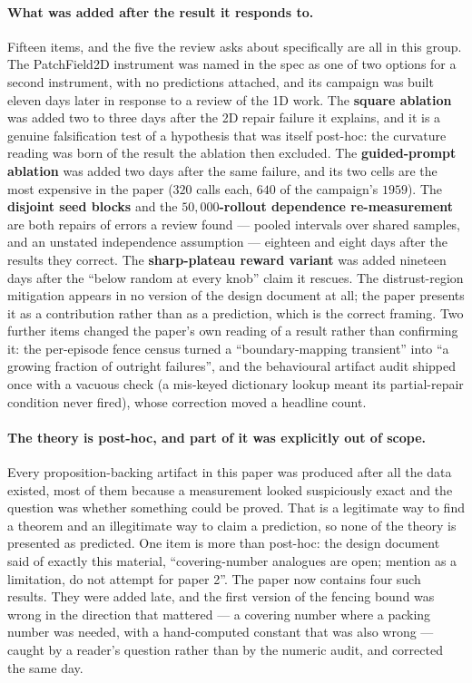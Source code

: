 \paragraph{What was added after the result it responds to.} Fifteen items, and the five the
review asks about specifically are all in this group. The PatchField2D instrument was named
in the spec as one of two options for a second instrument, with no predictions attached, and
its campaign was built eleven days later in response to a review of the 1D work. The
\textbf{square ablation} was added two to three days after the 2D repair failure it explains,
and it is a genuine falsification test of a hypothesis that was itself post-hoc: the
curvature reading was born of the result the ablation then excluded. The
\textbf{guided-prompt ablation} was added two days after the same failure, and its two cells
are the most expensive in the paper ($320$ calls each, $640$ of the campaign's $1959$). The
\textbf{disjoint seed blocks} and the \textbf{$50{,}000$-rollout dependence re-measurement}
are both repairs of errors a review found --- pooled intervals over shared samples, and an
unstated independence assumption --- eighteen and eight days after the results they correct.
The \textbf{sharp-plateau reward variant} was added nineteen days after the ``below random at
every knob'' claim it rescues. The distrust-region mitigation appears in no version of the
design document at all; the paper presents it as a contribution rather than as a prediction,
which is the correct framing. Two further items changed the paper's own reading of a result
rather than confirming it: the per-episode fence census turned a ``boundary-mapping
transient'' into ``a growing fraction of outright failures'', and the behavioural artifact
audit shipped once with a vacuous check (a mis-keyed dictionary lookup meant its
partial-repair condition never fired), whose correction moved a headline count.

\paragraph{The theory is post-hoc, and part of it was explicitly out of scope.} Every
proposition-backing artifact in this paper was produced after all the data existed, most of
them because a measurement looked suspiciously exact and the question was whether something
could be proved. That is a legitimate way to find a theorem and an illegitimate way to claim
a prediction, so none of the theory is presented as predicted. One item is more than
post-hoc: the design document said of exactly this material, ``covering-number analogues are
open; mention as a limitation, do not attempt for paper 2''. The paper now contains four
such results. They were added late, and the first version of the fencing bound was wrong in
the direction that mattered --- a covering number where a packing number was needed, with a
hand-computed constant that was also wrong --- caught by a reader's question rather than by
the numeric audit, and corrected the same day.

